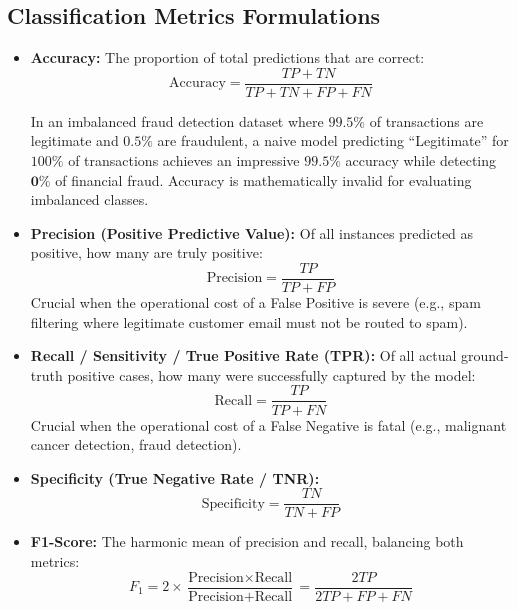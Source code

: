 \subsection{Classification Metrics Formulations}
\begin{itemize}
    \item \textbf{Accuracy:} The proportion of total predictions that are correct:
    \begin{equation}
    \text{Accuracy} = \frac{TP + TN}{TP + TN + FP + FN}
    \end{equation}
    \begin{tcolorbox}[colback=red!5!white,colframe=red!75!black,title=\textbf{The Accuracy Paradox in Imbalanced Datasets}]
    In an imbalanced fraud detection dataset where $99.5\%$ of transactions are legitimate and $0.5\%$ are fraudulent, a naive model predicting ``Legitimate'' for $100\%$ of transactions achieves an impressive $\mathbf{99.5\%}$ accuracy while detecting $\mathbf{0\%}$ of financial fraud. Accuracy is mathematically invalid for evaluating imbalanced classes.
    \end{tcolorbox}
    \item \textbf{Precision (Positive Predictive Value):} Of all instances predicted as positive, how many are truly positive:
    \begin{equation}
    \text{Precision} = \frac{TP}{TP + FP}
    \end{equation}
    Crucial when the operational cost of a False Positive is severe (e.g., spam filtering where legitimate customer email must not be routed to spam).
    \item \textbf{Recall / Sensitivity / True Positive Rate (TPR):} Of all actual ground-truth positive cases, how many were successfully captured by the model:
    \begin{equation}
    \text{Recall} = \frac{TP}{TP + FN}
    \end{equation}
    Crucial when the operational cost of a False Negative is fatal (e.g., malignant cancer detection, fraud detection).
    \item \textbf{Specificity (True Negative Rate / TNR):}
    \begin{equation}
    \text{Specificity} = \frac{TN}{TN + FP}
    \end{equation}
    \item \textbf{F1-Score:} The harmonic mean of precision and recall, balancing both metrics:
    \begin{equation}
    F_1 = 2 \times \frac{\text{Precision} \times \text{Recall}}{\text{Precision} + \text{Recall}} = \frac{2TP}{2TP + FP + FN}

\end{equation}
\end{itemize}
